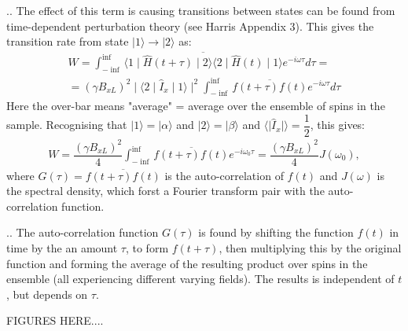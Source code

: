 \documentclass{beamer}
\begin{document}
\begin{frame}{\thesection.\thesubsection. \insertsubsection}
   The effect of this term is causing transitions between states can be found from time-dependent perturbation theory (see Harris Appendix 3). This gives the transition rate from state $\mid 1 \rangle \rightarrow \mid 2 \rangle$ as:  
    \begin{multline}
       W = \int_{- \inf}^{\inf} \overline{ \langle 1 \mid \hat{H}(t+ \tau) \mid 2  \rangle \langle 2 \mid  \hat{H}(t)  \mid 1 \rangle  } e^{-i \omega \tau} d\tau = \\
       = (\gamma B_{xL})^2 \mid \langle 2 \mid \hat{I}_x \mid 1 \rangle \mid^2 \int_{ -\inf}^{\inf} \overline{ f(t+\tau) f(t) } e^{-i \omega \tau} d\tau
    \end{multline}
    Here the over-bar means "average" = average over the ensemble of spins in the sample. Recognising that $ \vert 1 \rangle = \vert \alpha \rangle $ and $ \vert 2 \rangle = \vert \beta \rangle $ and $ \langle  \mid  \hat{I}_x \mid \rangle  = \dfrac{1}{2} $, this gives:
    \begin{multline}
       W = \dfrac{(\gamma B_{xL})^2}{4} \int_{- \inf}^{\inf} \overline{f(t+\tau) f(t)} e^{-i \omega_0 \tau} = \dfrac{(\gamma B_{xL})^2}{4} J(\omega_0),
    \end{multline}
    where $G(\tau) = \overline{f(t+ \tau) f(t)}$ is the \alert{auto-correlation} of $f(t)$ and $J(\omega)$ is the \alert{spectral density}, which forst a Fourier transform pair with the auto-correlation function.
\end{frame}

\begin{frame}{\thesection.\thesubsection. \insertsubsection}
	The auto-correlation function $G(\tau)$ is found by shifting the function $f(t)$ in time by the an amount $\tau$, to form $f(t + \tau)$, then multiplying this by the original function and forming the average of the resulting product over spins in the ensemble (all experiencing different varying fields). The results is independent of $t$, but depends on $\tau$.
	
	FIGURES HERE....
\end{frame}
\end{document}
